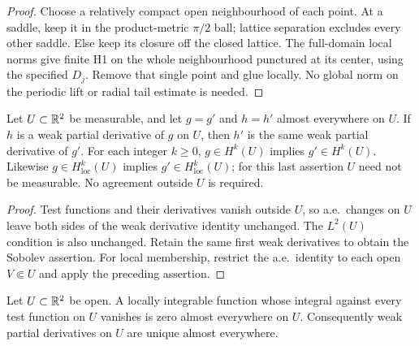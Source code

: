 \begin{proof}
\leanok
Choose a relatively compact open neighbourhood of each point.
At a saddle, keep it in the product-metric $\pi/2$ ball; lattice separation
excludes every other saddle. Else keep its closure off the closed lattice.
The full-domain local norms give finite H1 on the whole neighbourhood
punctured at its center, using the specified $D_j$.
Remove that single point and glue locally.
No global norm on the periodic lift or radial tail estimate is needed.
\end{proof}

\begin{lemma}
\label{lem:sobolev-congr-ae}
\leanok
Let $U\subset\mathbb{R}^2$ be measurable, and let $g=g'$ and $h=h'$ almost
everywhere on $U$. If $h$ is a weak partial derivative of $g$ on $U$,
then $h'$ is the same weak partial derivative of $g'$.
For each integer $k\ge0$, $g\in H^k(U)$ implies $g'\in H^k(U)$.
Likewise $g\in H^k_{\mathrm{loc}}(U)$ implies
$g'\in H^k_{\mathrm{loc}}(U)$; for this last assertion $U$ need not be
measurable. No agreement outside $U$ is required.
\end{lemma}

\begin{proof}
\leanok
Test functions and their derivatives vanish outside $U$, so a.e.\ changes
on $U$ leave both sides of the weak derivative identity unchanged.
The $L^2(U)$ condition is also unchanged. Retain the same first weak
derivatives to obtain the Sobolev assertion. For local membership, restrict
the a.e.\ identity to each open $V\Subset U$ and apply the preceding assertion.
\end{proof}

\begin{lemma}
\label{lem:weak-derivative-unique}
\leanok
Let $U\subset\mathbb{R}^2$ be open. A locally integrable function whose integral
against every test function on $U$ vanishes is zero almost everywhere on $U$.
Consequently weak partial derivatives on $U$ are unique almost everywhere.
\end{lemma}


